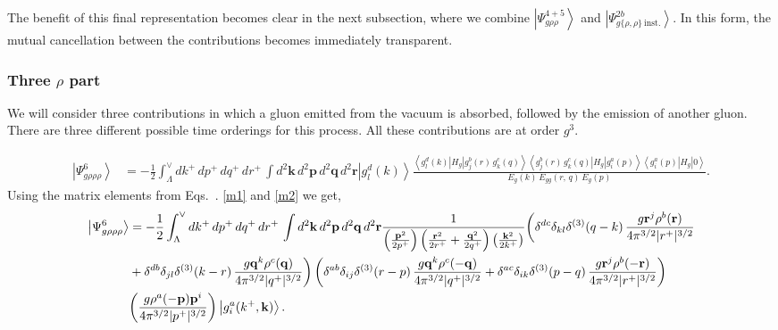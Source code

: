 \documentclass[aps,prd,amsmath,amssymb,nofootinbib]{revtex4-2}
\numberwithin{equation}{section}
\begin{document}
The benefit of this final representation becomes clear in the next subsection, where we combine $\left|\Psi_{g\rho\rho}^{4+5}\right\rangle$ and $\left|\Psi_{g\{\rho,\rho\}\:\text{inst.}}^{2b}\right\rangle$. In this form, the mutual cancellation between the contributions becomes immediately transparent.
\subsubsection{Three $\rho$ part}
We will consider three contributions in which a gluon emitted from the vacuum is absorbed, followed by the emission of another gluon. There are three different possible time orderings for this process. All these contributions are at order $g^{3}$. 
\begin{figure}[h]
    \label{fig:1}
\end{figure}
\begin{figure}[h]
    \label{fig:2} 
\end{figure}
\begin{align}\label{3rho}
 \left|\Psi_{g\rho\rho\rho}^{6}\right\rangle  & = -\frac{1}{2}\int_{\Lambda}^{\vee}dk^{+}\, dp^{+}\, dq^{+}\, dr^{+}\,\int d^{2}\mathbf{k}\, d^{2}\mathbf{p}\, d^{2}\mathbf{q}\, d^{2}\mathbf{r}\left|g_{l}^{d}(k)\right\rangle \frac{\left\langle g_{l}^{d}(k)\left|H_{g}\right|g_{j}^{b}(r)\, g_{k}^{c}(q)\right\rangle \left\langle g_{j}^{b}(r)\, g_{k}^{c}(q)\left|H_{g}\right|g_{i}^{a}(p)\right\rangle \left\langle g_{i}^{a}(p)\left|H_{g}\right|0\right\rangle }{E_{g}(k)\, E_{gg}(r,\, q)\, E_{g}(p)}.
\end{align}
Using the matrix elements from Eqs.~. \eqref{m1} and \eqref{m2} we get,
\begin{align}\label{stseve}
\left|\Psi_{g\rho\rho\rho}^{6}\right\rangle & =-\frac{1}{2}\int_{\Lambda}^{\vee}dk^{+}\, dp^{+}\, dq^{+}\, dr^{+}\,\int d^{2}\mathbf{k}\, d^{2}\mathbf{p}\, d^{2}\mathbf{q}\, d^{2}\mathbf{r}\frac{1}{\left(\frac{\mathbf{p}^{2}}{2p^{+}}\right)\left(\frac{\mathbf{r}^{2}}{2r^{+}}+\frac{\mathbf{q}^{2}}{2q^{+}}\right)\left(\frac{\mathbf{k}^{2}}{2k^{+}}\right)}\bigg(\delta^{dc}\delta_{kl}\delta^{(3)}(q-k)\,\frac{g\mathbf{r}^{j}\rho^{b}(\mathbf{r})}{4\pi^{3/2}|r^{+}|^{3/2}}\notag \\ & +\delta^{db}\delta_{jl}\delta^{(3)}(k-r)\,\frac{g\mathbf{q}^{k}\rho^{c}(\mathbf{q})}{4\pi^{3/2}|q^{+}|^{3/2}}\bigg)\left(\delta^{ab}\delta_{ij}\delta^{(3)}(r-p)\,\frac{g\mathbf{q}^{k}\rho^{c}(-\mathbf{q})}{4\pi^{3/2}|q^{+}|^{3/2}}+\delta^{ac}\delta_{ik}\delta^{(3)}(p-q)\,\frac{g\mathbf{r}^{j}\rho^{b}(-\mathbf{r})}{4\pi^{3/2}|r^{+}|^{3/2}}\right)\notag \\ & \bigg(\frac{g\rho^{a}(-\mathbf{p})\mathbf{p}^{i}}{4\pi^{3/2}|p^{+}|^{3/2}}\bigg)\left|g_{i}^{a}(k^{+},\mathbf{k})\right\rangle.
\end{align}
\end{document}
